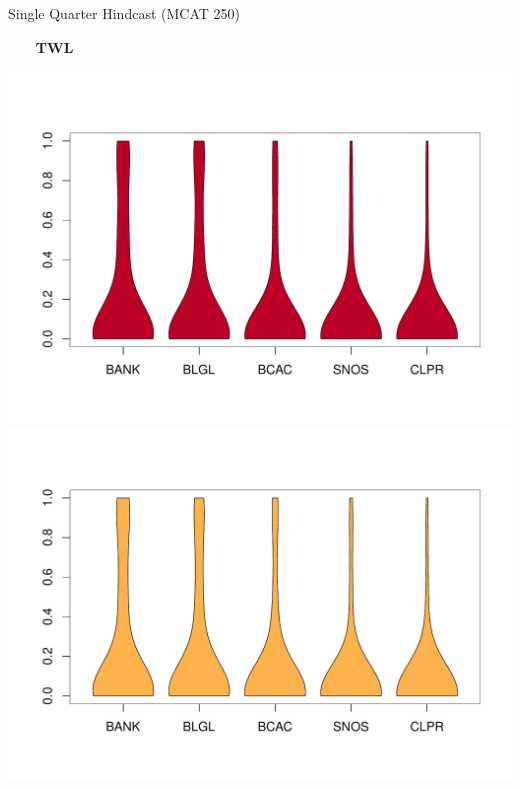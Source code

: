 \documentclass[ xcolor = pdftex, dvipsnames, table ]{beamer}
\begin{document}
\begin{frame}{Single Quarter Hindcast (MCAT 250)}
\begin{minipage}{0.29\textwidth}
\end{minipage}
\hspace*{0.5cm}
\begin{minipage}{0.29\textwidth}
\begin{center}
$~~~~~~~~~$\textbf{TWL}
\end{center}
\vspace*{-0.75cm}
\includegraphics[height=0.36\textheight]{../pictures/vioOSBTWL.pdf}\\
\vspace*{-1.3cm}
\includegraphics[height=0.36\textheight]{../pictures/vioOLATWL.pdf}\\
\vspace*{-1.3cm}

\end{minipage}
\end{frame}
\end{document}
